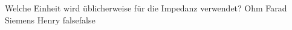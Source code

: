     {Welche Einheit wird üblicherweise für die Impedanz verwendet?}
    {Ohm}
    {Farad}
    {Siemens}
    {Henry}
    {false}{false}